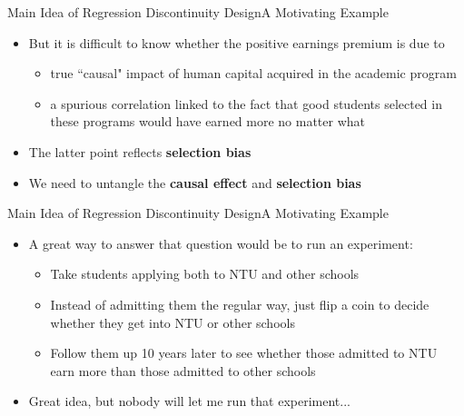 \documentclass[hyperref={pdfpagelabels=false}]{beamer}
\begin{document}
	
	
	
	\begin{frame}{Main Idea of Regression Discontinuity Design}{A Motivating Example}
		\begin{itemize}
			
			\item But it is difficult to know whether the positive earnings premium is
			due to
			\vspace{0.2cm}
			\begin{itemize}
				
				\item true ``causal" impact of human capital acquired in the academic program
				\vspace{0.2cm}
				\item a spurious correlation linked to the fact that good students selected in these
				programs would have earned more no matter what
				\vspace{0.2cm}
			\end{itemize}
			\item The latter point reflects \textbf{selection bias}
			\vspace{0.2cm}
			\item We need to untangle the \textbf{causal effect} and \textbf{selection bias}
			
		\end{itemize}
	\end{frame}
	
	
	\begin{frame}{Main Idea of Regression Discontinuity Design}{A Motivating Example}
		\begin{itemize}
			
			
			\item A great way to answer that question would be to run an experiment:
			\vspace{0.2cm}
			\begin{itemize}
				\item Take students applying both to NTU and other schools
				\vspace{0.2cm}
				\item Instead of admitting them the regular way, just flip a coin to decide whether they
				get into NTU or other schools
				\vspace{0.2cm}
				\item Follow them up 10 years later to see whether those admitted to NTU earn more than those admitted to other schools
				\vspace{0.2cm}
			\end{itemize}
			
			\item Great idea, but nobody will let me run that experiment...
			
			
		\end{itemize}
	\end{frame}
	
\end{document}
